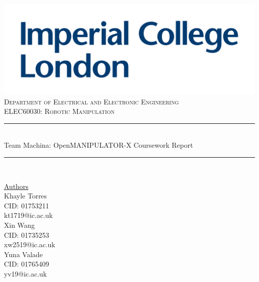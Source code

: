 \documentclass[10pt, a4paper]{article}
\begin{document}
\begin{titlepage}
	\newcommand{\HRule}{\rule{\linewidth}{0.5mm}}
    \includegraphics[scale=0.1]{./Images/Imperial_Logo.jpg} 
    \\
    \center 
	\textsc{\large Department of Electrical and Electronic Engineering }\\[0.5cm] 
	\textsc{\normalsize ELEC60030: Robotic Manipulation}\\[0.5cm] 
    
	\HRule \\[0.4cm]
	Team Machina: OpenMANIPULATOR-X Coursework Report
    \HRule \\[1.5cm]
     
    \begin{center}
		\underline{Authors}\\[0.5cm] 
        Khayle Torres \\ CID: 01753211 \\ kt1719@ic.ac.uk \\ [0.5cm]

        Xin Wang \\ CID: 01735253 \\ xw2519@ic.ac.uk \\ [0.5cm]
        
        Yuna Valade \\ CID: 01765409 \\ yv19@ic.ac.uk \\ [0.5cm]

	\end{center} \large

    \vfill 
    \makeatletter
    \@date 
    \makeatother
\end{titlepage}

\renewcommand{\baselinestretch}{0.75}\normalsize
\tableofcontents
\renewcommand{\baselinestretch}{1.0}\normalsize

\pagebreak
\end{document}

